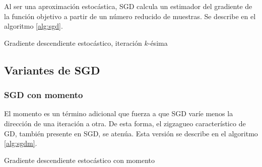 Al ser una aproximación estocástica, SGD calcula un estimador del
gradiente de la función objetivo a partir de un número reducido de
muestras. Se describe en el algoritmo \ref{alg:sgd}.

\begin{algorithm}
\caption{Gradiente descendiente estocástico, iteración $k$-ésima}
\label{alg:sgd}
\begin{algorithmic}
  \ENDWHILE
\end{algorithmic}
\end{algorithm}

\subsection{Variantes de SGD}\label{variantes-de-sgd}

\subsubsection{SGD con momento}\label{sgd-con-momento}

El momento es un término adicional que fuerza a que SGD varíe menos la
dirección de una iteración a otra. De esta forma, el zigzagueo
característico de GD, también presente en SGD, se atenúa. Esta versión
se describe en el algoritmo \ref{alg:sgdm}.

\begin{algorithm}
\caption{Gradiente descendiente estocástico con momento}
\label{alg:sgdm}
\begin{algorithmic}
  \ENDWHILE
\end{algorithmic}
\end{algorithm}

